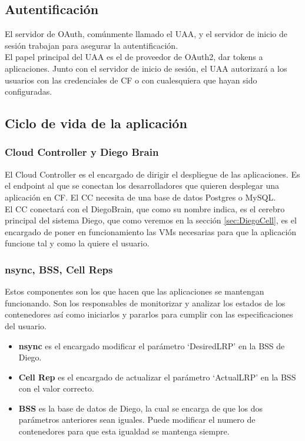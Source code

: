 \documentclass[a4paper,11pt]{article}
\begin{document}
\subsection{Autentificación}
El servidor de OAuth, comúnmente llamado el UAA, y el servidor de inicio de sesión trabajan para asegurar la autentificación.\\
El papel principal del UAA es el de proveedor de OAuth2, dar tokens a aplicaciones. Junto con el servidor de inicio de sesión, el UAA autorizará a los usuarios con las credenciales de CF o con cualesquiera que hayan sido configuradas.

\subsection{Ciclo de vida de la aplicación}
\subsubsection{Cloud Controller y Diego Brain}
El Cloud Controller es el encargado de dirigir el despliegue de las aplicaciones. Es el endpoint al que se conectan los desarrolladores que quieren desplegar una aplicación en CF. El CC necesita de una base de datos Postgres o MySQL.\\
El CC conectará con el DiegoBrain, que como su nombre indica, es el cerebro principal del sistema Diego, que como veremos en la sección \ref{sec:DiegoCell}, es el encargado de poner en funcionamiento las VMs necesarias para que la aplicación funcione tal y como la quiere el usuario.

\subsubsection{nsync, BSS, Cell Reps}
Estos componentes son los que hacen que las aplicaciones se mantengan funcionando. Son los responsables de monitorizar y analizar los estados de los contenedores así como iniciarlos y pararlos para cumplir con las especificaciones del usuario.

\begin{itemize}
  \item \textbf{nsync} es el encargado modificar el parámetro `DesiredLRP' en la BSS de Diego.
  \item \textbf{Cell Rep} es el encargado de actualizar el parámetro `ActualLRP' en la BSS con el valor correcto.
  \item \textbf{BSS} es la base de datos de Diego, la cual se encarga de que los dos parámetros anteriores sean iguales. Puede modificar el numero de contenedores para que esta igualdad se mantenga siempre.
\end{itemize}
\end{document}

